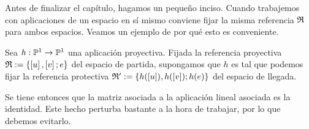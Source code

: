 Antes de finalizar el capítulo, hagamos un pequeño inciso. Cuando trabajemos con aplicaciones de un espacio en sí mismo conviene fijar la misma referencia $\mathfrak{R}$ para ambos espacios. Veamos un ejemplo de por qué esto es conveniente.
\begin{exa}[Identidad]
	Sea $h:\mathbb{P}^1\to\mathbb{P}^1$ una aplicación proyectiva. Fijada la referencia proyectiva $\mathfrak{R}:=\{\left [ u \right ],\left [ v \right ];e\}$ del espacio de partida, supongamos que $h$ es tal que podemos fijar la referencia protectiva $\mathfrak{R}':=\{h(\left [ u \right ]),h(\left [ v \right ]);h(e)\}$ del espacio de llegada.
	
	Se tiene entonces que la matriz asociada a la aplicación lineal asociada es la identidad. Este hecho perturba bastante a la hora de trabajar, por lo que debemos evitarlo.
\end{exa}